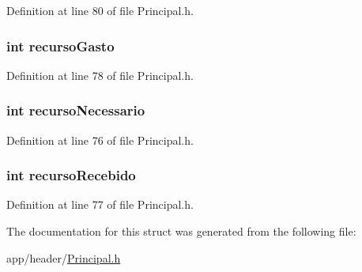 Definition at line 80 of file Principal.\-h.

\hypertarget{structcidade_a4c30c9bf20d81925543c43abfaee74ac}{
\subsubsection[{recurso\-Gasto}]{\setlength{\rightskip}{0pt plus 5cm}int recurso\-Gasto}}\label{structcidade_a4c30c9bf20d81925543c43abfaee74ac}


Definition at line 78 of file Principal.\-h.

\hypertarget{structcidade_ae8b356353114803f6f5076a6b7bb411a}{
\subsubsection[{recurso\-Necessario}]{\setlength{\rightskip}{0pt plus 5cm}int recurso\-Necessario}}\label{structcidade_ae8b356353114803f6f5076a6b7bb411a}


Definition at line 76 of file Principal.\-h.

\hypertarget{structcidade_a34541bd6c7eec1f2049716b02efe9572}{
\subsubsection[{recurso\-Recebido}]{\setlength{\rightskip}{0pt plus 5cm}int recurso\-Recebido}}\label{structcidade_a34541bd6c7eec1f2049716b02efe9572}


Definition at line 77 of file Principal.\-h.



The documentation for this struct was generated from the following file\-:\begin{DoxyCompactItemize}
\item 
app/header/\hyperlink{_principal_8h}{Principal.\-h}\end{DoxyCompactItemize}
